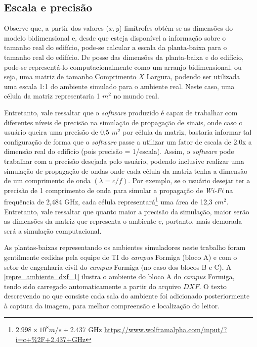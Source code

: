 \documentclass[
	12pt,				%
	twoside,			%
	a4paper,			%
	english,			%
	french,				%
	spanish,			%
	brazil				%
	]{abntex2}
\begin{document}
\subsection{Escala e precisão}\label{escala-e-precisuxe3o}

Observe que, a partir dos valores (\(x, y\)) limítrofes obtém-se as
dimensões do modelo bidimensional e, desde que esteja disponível a
informação sobre o tamanho real do edifício, pode-se calcular a escala
da planta-baixa para o tamanho real do edifício. De posse das dimensões
da planta-baixa e do edifício, pode-se representá-lo computacionalmente
como um arranjo bidimensional, ou seja, uma matriz de tamanho
Comprimento \(X\) Largura, podendo ser utilizada uma escala 1:1 do
ambiente simulado para o ambiente real. Neste caso, uma célula da matriz
representaria 1 \(m^{2}\) no mundo real.

Entretanto, vale ressaltar que o \emph{software} produzido é capaz de
trabalhar com diferentes níveis de precisão na simulação de propagação
de sinais, onde caso o usuário queira uma precisão de 0,5 \(m^{2}\) por
célula da matriz, bastaria informar tal configuração de forma que o
\emph{software} passe a utilizar um fator de escala de 2.0x a dimensão
real do edifício (pois precisão = 1/escala). Assim, o \emph{software}
pode trabalhar com a precisão desejada pelo usuário, podendo inclusive
realizar uma simulação de propagação de ondas onde cada célula da matriz
tenha a dimensão de um comprimento de onda \((\lambda = c/f)\). Por
exemplo, se o usuário desejar ter a precisão de 1 comprimento de onda
para simular a propagação de \emph{Wi-Fi} na frequência de 2,484 GHz,
cada célula representará\footnote{\(2.998\times10^{8} m/s \div 2.437\)
  GHz \url{https://www.wolframalpha.com/input/?i=c+\%2F+2.437+GHz}} uma
área de 12,3 \(cm^{2}\). Entretanto, vale ressaltar que quanto maior a
precisão da simulação, maior serão as dimensões da matriz que representa
o ambiente e, portanto, mais demorada será a simulação computacional.

As plantas-baixas representando os ambientes simuladores neste trabalho
foram gentilmente cedidas pela equipe de TI do \emph{campus} Formiga
(bloco A) e com o setor de engenharia civil do \emph{campus} Formiga (no
caso dos blocos B e C). A \autoref{repre_ambiente_dxf_1} ilustra o
ambiente do bloco A do \emph{campus} Formiga, tendo sido carregado
automaticamente a partir do arquivo \(DXF\). O texto descrevendo no que
consiste cada sala do ambiente foi adicionado posteriormente à captura
da imagem, para melhor compreensão e localização do leitor.
\end{document}
